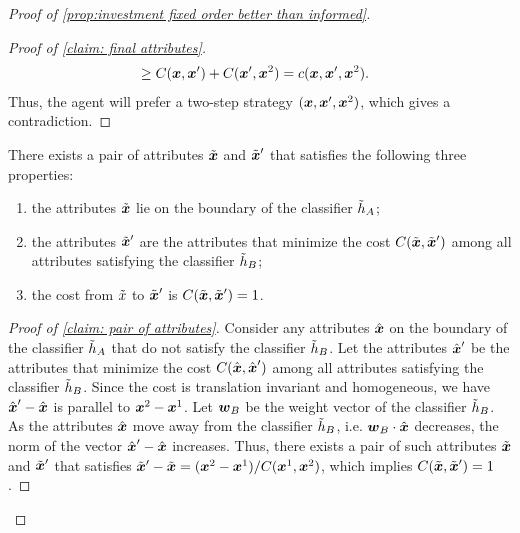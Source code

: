 \begin{proof}[Proof of \cref{prop:investment fixed order better than informed}]
\begin{proof}[Proof of \cref{claim: final attributes}]
\begin{align*}
        &\geq C(\boldsymbol{x},\boldsymbol{x}') + C(\boldsymbol{x}',\boldsymbol{x}^2) = c(\boldsymbol{x},\boldsymbol{x}',\boldsymbol{x}^2).
    \end{align*}
    Thus, the agent will prefer a two-step strategy $(\boldsymbol{x},\boldsymbol{x}',\boldsymbol{x}^2)$, which gives a contradiction.
    \end{proof}
    
    
    \begin{claim}\label{claim: pair of attributes}
        There exists a pair of attributes $\tilde {\boldsymbol{x}}$ and $\tilde {\boldsymbol{x}}'$ that satisfies the following three properties: 
        \begin{enumerate}
            \item the attributes $\tilde {\boldsymbol{x}}$ lie on the boundary of the classifier $\tilde {h}_A$;
    \item the attributes $\tilde {\boldsymbol{x}}'$ are the attributes that minimize the cost $C(\tilde {\boldsymbol{x}}, \tilde {\boldsymbol{x}}')$ among all attributes satisfying the classifier $\tilde {h}_B$; 
    \item the cost from $\tilde {x}$ to $\tilde {\boldsymbol{x}}'$ is $C(\tilde{\boldsymbol{x}}, \tilde {\boldsymbol{x}}') = 1$.
        \end{enumerate}
    \end{claim}

\begin{proof}[Proof of \cref{claim: pair of attributes}]
     Consider any attributes $\hat {\boldsymbol{x}}$ on the boundary of the classifier $\tilde {h}_A$ that do not satisfy the classifier $\tilde {h}_B$. Let the attributes $\hat {\boldsymbol{x}}'$ be the attributes that minimize the cost $C(\hat {\boldsymbol{x}}, \hat {\boldsymbol{x}}')$ among all attributes satisfying the classifier $\tilde {h}_B$.
    Since the cost is translation invariant and homogeneous, we have $\hat {\boldsymbol{x}}' - \hat {\boldsymbol{x}}$ is parallel to $\boldsymbol{x}^2 - \boldsymbol{x}^1$. 
    Let $\boldsymbol{w}_B$ be the weight vector of the classifier $\tilde {h}_B$.
    As the attributes $\hat {\boldsymbol{x}}$ move away from the classifier $\tilde {h}_B$, i.e. $\boldsymbol{w}_B \cdot \hat{\boldsymbol{x}}$ decreases, the norm of the vector $\hat {\boldsymbol{x}}' - \hat{\boldsymbol{x}}$ increases. 
    Thus, there exists a pair of such attributes $\tilde {\boldsymbol{x}}$ and $\tilde {\boldsymbol{x}}'$ that satisfies $\tilde {\boldsymbol{x}}' - \tilde {\boldsymbol{x}} = (\boldsymbol{x}^2 - \boldsymbol{x}^1)/ C(\boldsymbol{x}^1,\boldsymbol{x}^2)$, which implies $C(\tilde{\boldsymbol{x}}, \tilde {\boldsymbol{x}}') = 1$.
\end{proof}
   

\end{proof}
